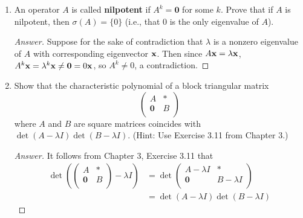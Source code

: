 \documentclass[../psets.tex]{subfiles}
\begin{document}
\begin{enumerate}[label={\textbf{1.\arabic*.}}]
\begin{proof}[Answer]
        Since the determinant of a triangular matrix is the product of its diagonal entries, we have that
        \begin{equation*}
            \det(A-\lambda I) = (a_{1,1}-\lambda)(a_{2,2}-\lambda)\cdots(a_{n,n}-\lambda)
        \end{equation*}
        But this polynomial is zero only if and only if $\lambda$ is a diagonal entry, so the eigenvalues must be the diagonal entries.
    \end{proof}
    \item An operator $A$ is called \textbf{nilpotent} if $A^k=\bm{0}$ for some $k$. Prove that if $A$ is nilpotent, then $\sigma(A)=\{0\}$ (i.e., that 0 is the only eigenvalue of $A$).
    \begin{proof}[Answer]
        Suppose for the sake of contradiction that $\lambda$ is a nonzero eigenvalue of $A$ with corresponding eigenvector $\mathbf{x}$. Then since $A\mathbf{x}=\lambda\mathbf{x}$, $A^k\mathbf{x}=\lambda^k\mathbf{x}\neq\bm{0}=0\mathbf{x}$, so $A^k\neq 0$, a contradiction.
    \end{proof}
    \item Show that the characteristic polynomial of a block triangular matrix
    \begin{equation*}
        \begin{pmatrix}
            A & *\\
            \bm{0} & B\\
        \end{pmatrix}
    \end{equation*}
    where $A$ and $B$ are square matrices coincides with $\det(A-\lambda I)\det(B-\lambda I)$. (Hint: Use Exercise 3.11 from Chapter 3.)
    \begin{proof}[Answer]
        It follows from Chapter 3, Exercise 3.11 that
        \begin{align*}
            \det\left(
                \begin{pmatrix}
                    A & *\\
                    \bm{0} & B\\
                \end{pmatrix}
                -\lambda I
            \right) &= \det
            \begin{pmatrix}
                A-\lambda I & *\\
                \bm{0} & B-\lambda I\\
            \end{pmatrix}\\
            &= \det(A-\lambda I)\det(B-\lambda I)

\end{align*}
\end{proof}
\end{enumerate}
\end{document}
